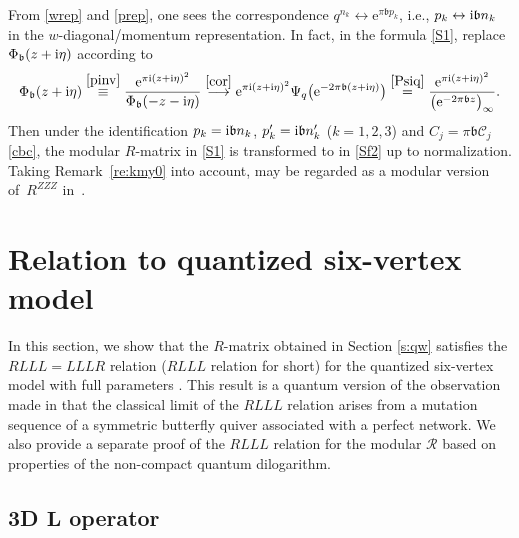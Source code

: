 \documentclass[pdftex]{sigma}
\newcommand{\bb}{{\mathfrak b}}
\newcommand{\e}{{\mathrm e}}
\numberwithin{equation}{section}
\begin{document}
\begin{Remark}\label{re:kon}
From \eqref{wrep} and \eqref{prep},
one sees the correspondence $q^{n_k} \leftrightarrow \e^{\pi \bb p_k}$, i.e.,
$p_k \leftrightarrow {\rm i} \bb n_k$ in the $w$-diagonal/momentum representation.
In fact, in the formula \eqref{S1}, replace $\Phi_\bb(z+{\rm i}\eta)$ according to
\[
\Phi_\bb(z+{\rm i}\eta) \overset{\eqref{pinv}}{\equiv}
 \frac{\e^{\pi {\rm i}(z+{\rm i}\eta)^2}}{\Phi_\bb(-z-{\rm i}\eta)}
\overset{\eqref{cor}}{\longrightarrow}
\e^{\pi {\rm i}(z+{\rm i}\eta)^2}\Psi_q\bigl(\e^{-2\pi \bb(z+{\rm i}\eta)}\bigr)
\overset{\eqref{Psiq}}{=} \frac{\e^{\pi {\rm i}(z+{\rm i}\eta)^2}}{\bigl(\e^{-2\pi \bb z}\bigr)_\infty}.
\]
Then under the identification $p_k ={\rm i} \bb n_k$, $p'_k = {\rm i} \bb n'_k$
($k=1, 2, 3$) and $C_j = \pi \bb \mathcal{C}_j$ \eqref{cbc}, the
modular $R$-matrix  in
\eqref{S1} is transformed to  in
\eqref{Sf2} up to normalization. Taking Remark~\ref{re:kmy0} into
account,  may be
regarded as a modular version of~$R^{ZZZ}$ in~\cite{KMY23}.
\end{Remark}

\section{Relation to quantized six-vertex model}\label{s:6v}

In this section, we show that the $R$-matrix obtained in Section
\ref{s:qw} satisfies the $RLLL = LLLR$ relation ($RLLL$ relation for
short) for the quantized six-vertex model with full parameters
\cite{KMY23}. This result is a quantum version of the observation
made in \cite{GSZ21} that the classical limit of the $RLLL$ relation
arises from a mutation sequence of a symmetric butterfly quiver
associated with a perfect network. We also provide a separate proof
of the $RLLL$ relation for the modular $\mathcal{R}$ based on
properties of the non-compact quantum dilogarithm.


\subsection[3D L operator]{3D $\boldsymbol{L}$ operator}
\end{document}
